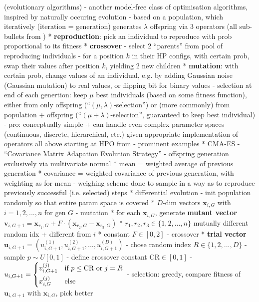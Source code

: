 \documentclass[twoside,11pt]{article}
\begin{document}
(evolutionary algorithms)
- another model-free class of optimisation algorithms, inspired by naturally occuring evolution
- based on a population, which iteratively (iteration = generation) generates $\lambda$ offspring via 3 operators (all sub-bullets from \citet[pp. 10-]{genetic_algos})
  * \textbf{reproduction}: pick an individual to reproduce with prob proportional to its fitness
  * \textbf{crossover}
    - select 2 ``parents'' from pool of reproducing individuals
    - for a position $k$ in their HP configs, with certain prob, swap their values after position $k$, yielding 2 new children
  * \textbf{mutation}: with certain prob, change values of an individual, e.g. by adding Gaussian noise (Gaussian mutation) to real values, or flipping bit for binary values
- selection at end of each genertion: keep $\mu$ best individuals (based on some fitness function), either from only offspring (``$(\mu,\lambda)$-selection'')
  or (more commonly) from population + offspring (``$(\mu+\lambda)$-selection'', guaranteed to keep best individual)
- pro: conceptually simple + can handle even complex parameter spaces (continuous, discrete, hierarchical, etc.) given appropriate implementation of operators
all above starting at HPO from \citep[chap. 1.3]{feurer_hyperparameter_2019}
- prominent examples
  * CMA-ES
    - ``Covariance Matrix Adapation Evolution Strategy''
    - offspring generation exclusively via multivariate normal \citep[p. 8]{hansen2023cmaevolutionstrategytutorial}
      * mean = weighted average of previous generation
      * covariance = weighted covariance of previous generation, with weighting as for mean
    - weighing scheme done to sample in a way as to reproduce previously successful (i.e. selected) steps \citep[p. 11]{hansen2023cmaevolutionstrategytutorial}
  * differential evolution \citep[-]{differential_evolution}
    - init population randomly so that entire param space is covered
      * $D$-dim vectors $\boldsymbol{x}_{i,G}$ with $i=1,2,...,n$ for gen $G$
    - mutation
      * for each $\boldsymbol{x}_{i,G}$, generate \textbf{mutant vector} $\boldsymbol{v}_{i,G+1}=\boldsymbol{x}_{r_1,G}+F\cdot(\boldsymbol{x}_{r_2,G}-\boldsymbol{x}_{r_3,G})$
      * $r_1,r_2,r_3\in\{1,2,...,n\}$ mutually different random idx + different from $i$
      * constant $F\in[0,2]$
    - crossover
      * \textbf{trial vector} $\boldsymbol{u}_{i,G+1}=(u_{i,G+1}^{(1)},u_{i,G+1}^{(2)},...,u_{i,G+1}^{(D)})$
        - chose random index $R\in\{1,2,...,D\}$
        - sample $p\sim U[0,1]$
        - define crossover constant $\text{CR}\in[0,1]$
        - $u_{i,G+1} = \begin{dcases}
          v_{i,G+1}^{(j)} & \text{if } p\le\text{CR}\text{ or } j=R \\
          x_{i,G}^{(j)} & \text{else}
         \end{dcases}$
    - selection: greedy, compare fitness of $\boldsymbol{u}_{i,G+1}$ with $\boldsymbol{x}_{i,G}$, pick better
\end{document}

